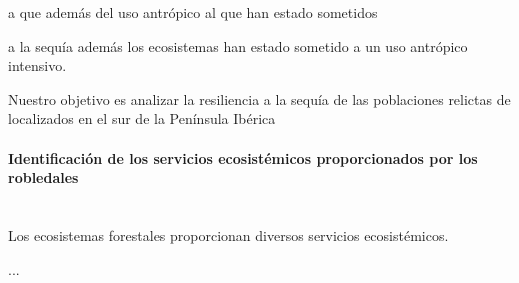 a que además del uso antrópico al que han estado sometidos 

a la sequía además los ecosistemas han estado sometido a un uso antrópico intensivo. 

Nuestro objetivo es analizar la resiliencia a la sequía de las poblaciones relictas de \Qpy localizados en el sur de la Península Ibérica 


\paragraph{Identificación de los servicios ecosistémicos proporcionados por los robledales}\mbox{} \\

Los ecosistemas forestales proporcionan diversos servicios ecosistémicos. 

... 
